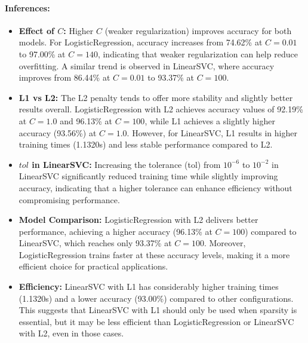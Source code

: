 \documentclass[11pt]{article}
\begin{document}
\paragraph{Inferences:}
\begin{itemize}
    \item \textbf{Effect of $C$:} Higher $C$ (weaker regularization) improves accuracy for both models. For LogisticRegression, accuracy increases from 74.62\% at $C=0.01$ to 97.00\% at $C=140$, indicating that weaker regularization can help reduce overfitting. A similar trend is observed in LinearSVC, where accuracy improves from 86.44\% at $C=0.01$ to 93.37\% at $C=100$.
    \item \textbf{L1 vs L2:} The L2 penalty tends to offer more stability and slightly better results overall. LogisticRegression with L2 achieves accuracy values of 92.19\% at $C=1.0$ and 96.13\% at $C=100$, while L1 achieves a slightly higher accuracy (93.56\%) at $C=1.0$. However, for LinearSVC, L1 results in higher training times (1.1320s) and less stable performance compared to L2.
         \item \textbf{$tol$ in LinearSVC:} Increasing the tolerance (tol) from $10^{-6}$ to $10^{-2}$ in LinearSVC significantly reduced training time while slightly improving accuracy, indicating that a higher tolerance can enhance efficiency without compromising performance.
    \item \textbf{Model Comparison:} LogisticRegression with L2 delivers better performance, achieving a higher accuracy (96.13\% at $C=100$) compared to LinearSVC, which reaches only 93.37\% at $C=100$. Moreover, LogisticRegression trains faster at these accuracy levels, making it a more efficient choice for practical applications.
    \item \textbf{Efficiency:} LinearSVC with L1 has considerably higher training times (1.1320s) and a lower accuracy (93.00\%) compared to other configurations. This suggests that LinearSVC with L1 should only be used when sparsity is essential, but it may be less efficient than LogisticRegression or LinearSVC with L2, even in those cases.
\end{itemize}
\end{document}
